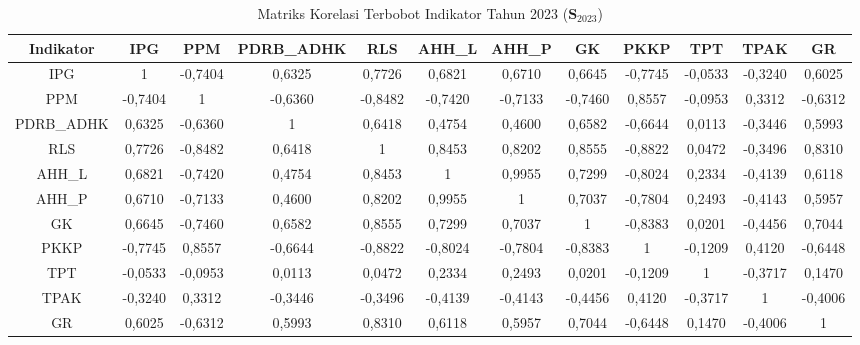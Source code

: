 \begin{table}[H]
\centering
\caption{Matriks Korelasi Terbobot Indikator Tahun 2023 ($\mathbf{S}_{2023}$)} \label{tab:app2matriks_intra_loading_2023}
\begin{adjustbox}{max width=\textwidth, max height=0.85\textheight}
\begin{tabular}{|c|c|c|c|c|c|c|c|c|c|c|c|}
\hline
\textbf{Indikator} & \textbf{IPG} & \textbf{PPM} & \textbf{PDRB\_ADHK} & \textbf{RLS} & \textbf{AHH\_L} & \textbf{AHH\_P} & \textbf{GK} & \textbf{PKKP} & \textbf{TPT} & \textbf{TPAK} & \textbf{GR} \\
\hline
IPG & 1 & -0,7404 & 0,6325 & 0,7726 & 0,6821 & 0,6710 & 0,6645 & -0,7745 & -0,0533 & -0,3240 & 0,6025 \\
PPM & -0,7404 & 1 & -0,6360 & -0,8482 & -0,7420 & -0,7133 & -0,7460 & 0,8557 & -0,0953 & 0,3312 & -0,6312 \\
PDRB\_ADHK & 0,6325 & -0,6360 & 1 & 0,6418 & 0,4754 & 0,4600 & 0,6582 & -0,6644 & 0,0113 & -0,3446 & 0,5993 \\
RLS & 0,7726 & -0,8482 & 0,6418 & 1 & 0,8453 & 0,8202 & 0,8555 & -0,8822 & 0,0472 & -0,3496 & 0,8310 \\
AHH\_L & 0,6821 & -0,7420 & 0,4754 & 0,8453 & 1 & 0,9955 & 0,7299 & -0,8024 & 0,2334 & -0,4139 & 0,6118 \\
AHH\_P & 0,6710 & -0,7133 & 0,4600 & 0,8202 & 0,9955 & 1 & 0,7037 & -0,7804 & 0,2493 & -0,4143 & 0,5957 \\
GK & 0,6645 & -0,7460 & 0,6582 & 0,8555 & 0,7299 & 0,7037 & 1 & -0,8383 & 0,0201 & -0,4456 & 0,7044 \\
PKKP & -0,7745 & 0,8557 & -0,6644 & -0,8822 & -0,8024 & -0,7804 & -0,8383 & 1 & -0,1209 & 0,4120 & -0,6448 \\
TPT & -0,0533 & -0,0953 & 0,0113 & 0,0472 & 0,2334 & 0,2493 & 0,0201 & -0,1209 & 1 & -0,3717 & 0,1470 \\
TPAK & -0,3240 & 0,3312 & -0,3446 & -0,3496 & -0,4139 & -0,4143 & -0,4456 & 0,4120 & -0,3717 & 1 & -0,4006 \\
GR & 0,6025 & -0,6312 & 0,5993 & 0,8310 & 0,6118 & 0,5957 & 0,7044 & -0,6448 & 0,1470 & -0,4006 & 1 \\
\hline
\end{tabular}
\end{adjustbox}
\end{table}